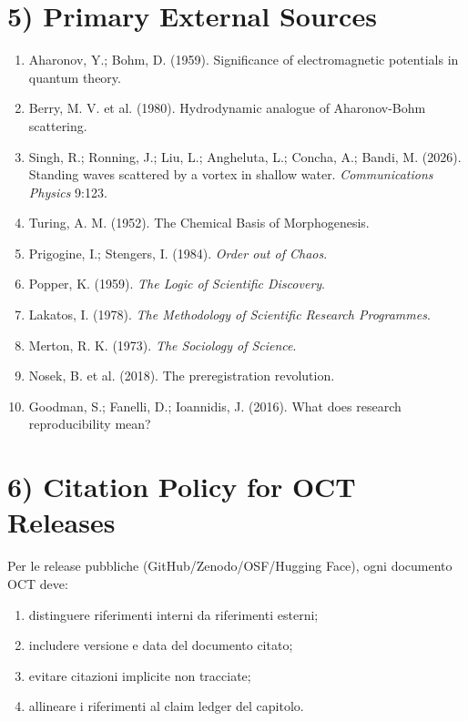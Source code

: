 \section{5) Primary External Sources}

\begin{enumerate}
\def\labelenumi{\arabic{enumi}.}
\tightlist
\item
  Aharonov, Y.; Bohm, D. (1959). Significance of electromagnetic potentials in quantum theory.
\item
  Berry, M. V. et al. (1980). Hydrodynamic analogue of Aharonov-Bohm scattering.
\item
  Singh, R.; Ronning, J.; Liu, L.; Angheluta, L.; Concha, A.; Bandi, M. (2026). Standing waves scattered by a vortex in shallow water. \emph{Communications Physics} 9:123.
\item
  Turing, A. M. (1952). The Chemical Basis of Morphogenesis.
\item
  Prigogine, I.; Stengers, I. (1984). \emph{Order out of Chaos}.
\item
  Popper, K. (1959). \emph{The Logic of Scientific Discovery}.
\item
  Lakatos, I. (1978). \emph{The Methodology of Scientific Research Programmes}.
\item
  Merton, R. K. (1973). \emph{The Sociology of Science}.
\item
  Nosek, B. et al. (2018). The preregistration revolution.
\item
  Goodman, S.; Fanelli, D.; Ioannidis, J. (2016). What does research reproducibility mean?
\end{enumerate}

\section{6) Citation Policy for OCT Releases}

Per le release pubbliche (GitHub/Zenodo/OSF/Hugging Face), ogni documento OCT deve:

\begin{enumerate}
\def\labelenumi{\arabic{enumi}.}
\tightlist
\item
  distinguere riferimenti interni da riferimenti esterni;
\item
  includere versione e data del documento citato;
\item
  evitare citazioni implicite non tracciate;
\item
  allineare i riferimenti al claim ledger del capitolo.
\end{enumerate}

